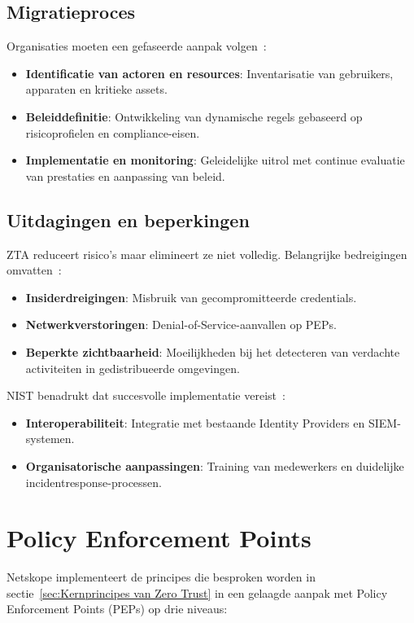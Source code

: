 \subsection{Migratieproces}
Organisaties moeten een gefaseerde aanpak volgen~\autocite{NIST2020}:  
\begin{itemize}
  \item \textbf{Identificatie van actoren en resources}: Inventarisatie van gebruikers, apparaten en kritieke assets.  
  \item \textbf{Beleiddefinitie}: Ontwikkeling van dynamische regels gebaseerd op risicoprofielen en compliance-eisen.  
  \item \textbf{Implementatie en monitoring}: Geleidelijke uitrol met continue evaluatie van prestaties en aanpassing van beleid.  
\end{itemize}

\subsection{Uitdagingen en beperkingen}
ZTA reduceert risico’s maar elimineert ze niet volledig. Belangrijke bedreigingen omvatten~\autocite{NIST2020}:  
\begin{itemize}
  \item \textbf{Insiderdreigingen}: Misbruik van gecompromitteerde credentials.  
  \item \textbf{Netwerkverstoringen}: Denial-of-Service-aanvallen op PEPs.  
  \item \textbf{Beperkte zichtbaarheid}: Moeilijkheden bij het detecteren van verdachte activiteiten in gedistribueerde omgevingen.  
\end{itemize}

NIST benadrukt dat succesvolle implementatie vereist~\autocite{NIST2020}:  
\begin{itemize}
  \item \textbf{Interoperabiliteit}: Integratie met bestaande Identity Providers en SIEM-systemen.  
  \item \textbf{Organisatorische aanpassingen}: Training van medewerkers en duidelijke incidentresponse-processen.
\end{itemize}

\section{Policy Enforcement Points}
Netskope implementeert de principes die besproken worden in sectie~\ref{sec:Kernprincipes van Zero Trust} in een gelaagde aanpak met Policy Enforcement Points (PEPs) op drie niveaus:

